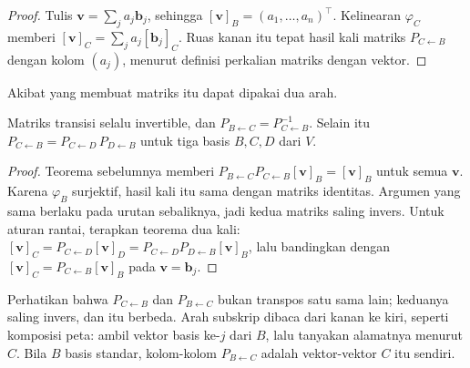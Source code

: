 \begin{proof}
Tulis $\mathbf{v}=\sum_{j}a_{j}\mathbf{b}_{j}$, sehingga
$[\mathbf{v}]_{B}=(a_{1},\dots,a_{n})^{\top}$.
Kelinearan $\varphi_{C}$ memberi
$[\mathbf{v}]_{C}=\sum_{j}a_{j}[\mathbf{b}_{j}]_{C}$. Ruas kanan itu tepat hasil kali
matriks
$P_{C\leftarrow B}$ dengan kolom $(a_{j})$, menurut definisi perkalian matriks dengan vektor.
\end{proof}

Akibat yang membuat matriks itu dapat dipakai dua arah.

\begin{akibat}
Matriks transisi selalu invertible, dan $P_{B\leftarrow C}=P_{C\leftarrow B}^{-1}$. Selain itu
$P_{C\leftarrow B}=P_{C\leftarrow D}\,P_{D\leftarrow B}$ untuk tiga basis $B,C,D$ dari $V$.
\end{akibat}

\begin{proof}
Teorema sebelumnya memberi $P_{B\leftarrow C}P_{C\leftarrow B}[\mathbf{v}]_{B}=[\mathbf{v}]_{B}$
untuk semua $\mathbf{v}$. Karena $\varphi_{B}$ surjektif, hasil kali itu sama dengan matriks
identitas. Argumen yang sama berlaku pada urutan sebaliknya, jadi kedua matriks saling
invers. Untuk aturan rantai, terapkan teorema dua kali:
$[\mathbf{v}]_{C}=P_{C\leftarrow D}[\mathbf{v}]_{D}=P_{C\leftarrow D}P_{D\leftarrow B}[\mathbf{v}]_{B}$,
lalu bandingkan dengan $[\mathbf{v}]_{C}=P_{C\leftarrow B}[\mathbf{v}]_{B}$ pada $\mathbf{v}=\mathbf{b}_{j}$.
\end{proof}

Perhatikan bahwa $P_{C\leftarrow B}$ dan $P_{B\leftarrow C}$ bukan transpos satu sama lain; keduanya saling invers, dan itu berbeda. Arah subskrip dibaca dari kanan ke kiri, seperti komposisi peta: ambil vektor basis ke-$j$ dari $B$, lalu tanyakan alamatnya menurut $C$. Bila $B$ basis standar, kolom-kolom $P_{B\leftarrow C}$ adalah vektor-vektor $C$ itu sendiri.

